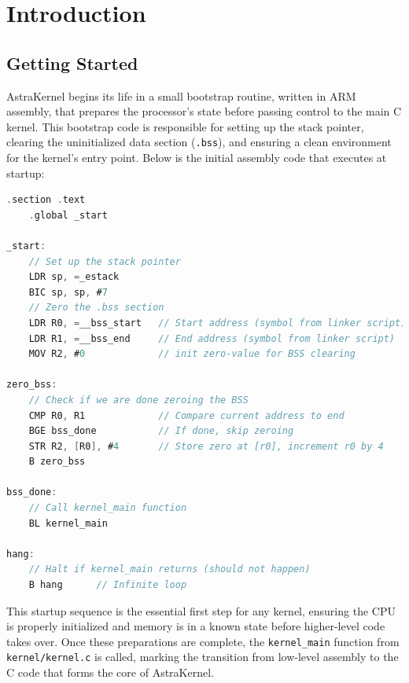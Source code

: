 \newpage
\chapter{Introduction}
\section{Getting Started}
AstraKernel begins its life in a small bootstrap routine, written in ARM assembly, 
that prepares the processor’s state before passing control to the main C kernel. 
This bootstrap code is responsible for setting up the stack pointer, clearing 
the uninitialized data section (\texttt{.bss}), and ensuring a clean environment 
for the kernel’s entry point. Below is the initial assembly code that executes 
at startup: \\

\begin{lstlisting}[language={C}, caption={Initial bootstrap code for AstraKernel.}, label={lst:bootstrap}]
    .section .text
    .global _start

_start:
    // Set up the stack pointer
    LDR sp, =_estack
    BIC sp, sp, #7
    // Zero the .bss section
    LDR R0, =__bss_start   // Start address (symbol from linker script)
    LDR R1, =__bss_end     // End address (symbol from linker script)
    MOV R2, #0             // init zero-value for BSS clearing

zero_bss:
    // Check if we are done zeroing the BSS
    CMP R0, R1             // Compare current address to end
    BGE bss_done           // If done, skip zeroing
    STR R2, [R0], #4       // Store zero at [r0], increment r0 by 4
    B zero_bss

bss_done:
    // Call kernel_main function
    BL kernel_main

hang:
    // Halt if kernel_main returns (should not happen)
    B hang		// Infinite loop
\end{lstlisting}

This startup sequence is the essential first step for any kernel, ensuring the 
CPU is properly initialized and memory is in a known state before higher-level 
code takes over. Once these preparations are complete, the \texttt{kernel\_main} 
function from \texttt{kernel/kernel.c} is called, marking the transition from 
low-level assembly to the C code that forms the core of AstraKernel.

